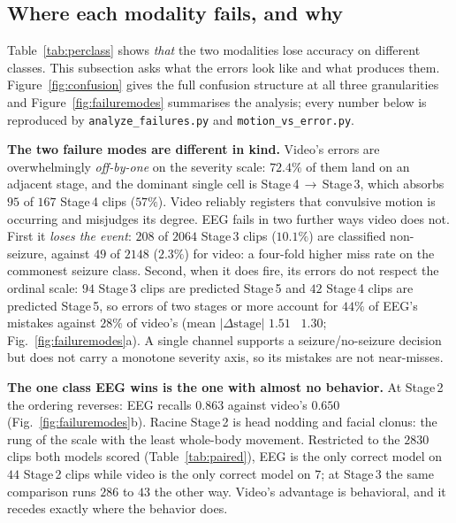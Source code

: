 \subsection{Where each modality fails, and why}
\label{sec:extraresults:failure}

Table~\ref{tab:perclass} shows \emph{that} the two modalities lose accuracy on
different classes. This subsection asks what the errors look like and what produces
them. Figure~\ref{fig:confusion} gives the full confusion structure at all three
granularities and Figure~\ref{fig:failuremodes} summarises the analysis; every
number below is reproduced by \texttt{analyze\_failures.py} and
\texttt{motion\_vs\_error.py}.

\noindent\textbf{The two failure modes are different in kind.}
Video's errors are overwhelmingly \emph{off-by-one} on the severity scale: $72.4\%$
of them land on an adjacent stage, and the dominant single cell is
Stage\,4\,$\to$\,Stage\,3, which absorbs $95$ of $167$ Stage\,4 clips ($57\%$). Video reliably registers that convulsive motion is occurring and misjudges its
degree. EEG fails in two further ways video does not. First it \emph{loses the event}:
$208$ of $2064$ Stage\,3 clips ($10.1\%$) are classified non-seizure, against $49$ of
$2148$ ($2.3\%$) for video: a four-fold higher miss rate on the commonest seizure
class. Second, when it does fire, its errors do not respect the ordinal scale:
$94$ Stage\,3 clips are predicted Stage\,5 and $42$ Stage\,4 clips are predicted
Stage\,5, so errors of two stages or more account for $44\%$ of EEG's mistakes
against $28\%$ of video's (mean $|\Delta\text{stage}|$ $1.51$ \vs\ $1.30$;
Fig.~\ref{fig:failuremodes}a). A single channel supports a seizure/no-seizure
decision but does not carry a monotone severity axis, so its mistakes are not
near-misses.

\noindent\textbf{The one class EEG wins is the one with almost no behavior.}
At Stage\,2 the ordering reverses: EEG recalls $0.863$ against video's $0.650$
(Fig.~\ref{fig:failuremodes}b). Racine Stage\,2 is head nodding and facial
clonus: the rung of the scale with the least whole-body movement. Restricted to the
$2830$ clips both models scored (Table~\ref{tab:paired}), EEG is the only correct
model on $44$ Stage\,2 clips while video is the only correct model on $7$; at
Stage\,3 the same comparison runs $286$ to $43$ the other way. Video's advantage is
behavioral, and it recedes exactly where the behavior does.

